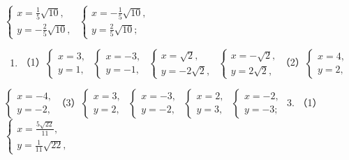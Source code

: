 \(\left\{ \begin{array}{l} x = \frac{1}{5}\sqrt{10}, \\ y = -\frac{2}{5}\sqrt{10}, \end{array} \right.\) \(\left\{ \begin{array}{l} x = -\frac{1}{5}\sqrt{10}, \\ y = \frac{2}{5}\sqrt{10}; \end{array} \right.\)

\begin{enumerate}[start=2]
\item
  （1）\(\left\{ \begin{array}{l} x = 3, \\ y = 1, \end{array} \right.\) \(\left\{ \begin{array}{l} x = -3, \\ y = -1, \end{array} \right.\) \(\left\{ \begin{array}{l} x = \sqrt{2}, \\ y = -2\sqrt{2}, \end{array} \right.\) \(\left\{ \begin{array}{l} x = -\sqrt{2}, \\ y = 2\sqrt{2}, \end{array} \right.\)（2）\(\left\{ \begin{array}{l} x = 4, \\ y = 2, \end{array} \right.\)
\end{enumerate}

\(\left\{ \begin{array}{l} x = -4, \\ y = -2, \end{array} \right.\)（3）\(\left\{ \begin{array}{l} x = 3, \\ y = 2, \end{array} \right.\) \(\left\{ \begin{array}{l} x = -3, \\ y = -2, \end{array} \right.\) \(\left\{ \begin{array}{l} x = 2, \\ y = 3, \end{array} \right.\) \(\left\{ \begin{array}{l} x = -2, \\ y = -3; \end{array} \right.\)
3.
（1）\(\left\{ \begin{array}{l} x = \frac{5\sqrt{22}}{11}, \\ y = \frac{1}{11}\sqrt{22}, \end{array} \right.\)

